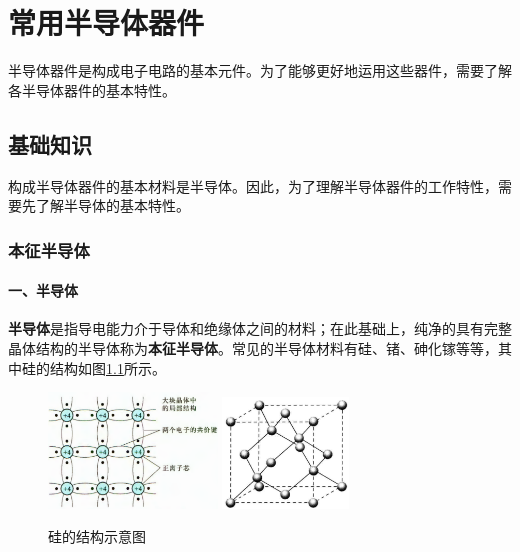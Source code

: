 \chapter{常用半导体器件}
半导体器件是构成电子电路的基本元件。为了能够更好地运用这些器件，需要了解各半导体器件的基本特性。

\section{基础知识}
构成半导体器件的基本材料是半导体。因此，为了理解半导体器件的工作特性，需要先了解半导体的基本特性。

\subsection{本征半导体}

\subsubsection{一、半导体}
\textbf{半导体}是指导电能力介于导体和绝缘体之间的材料；在此基础上，纯净的具有完整晶体结构的半导体称为\textbf{本征半导体}。常见的半导体材料有硅、锗、砷化镓等等，其中硅的结构如图\ref{硅的结构示意图}所示。

\begin{figure}[htb]
    \centering
        {\includegraphics[width=0.4\textwidth]{pic/硅的二维结构.png}}\qquad
        {\includegraphics[width=0.3\textwidth]{pic/硅的三维结构.png}}
    \caption{硅的结构示意图\label{硅的结构示意图}}
\end{figure}

